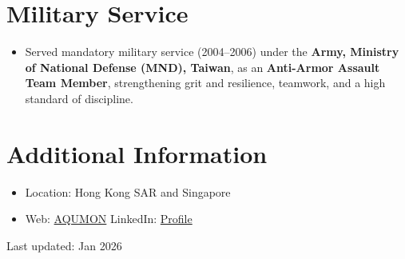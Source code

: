 \documentclass[11pt]{article}
\begin{document}
\section{Military Service}
\begin{itemize}
\item Served mandatory military service (2004--2006) under the \textbf{Army, Ministry of National Defense (MND), Taiwan}, as an \textbf{Anti-Armor Assault Team Member}, strengthening grit and resilience, teamwork, and a high standard of discipline.

\end{itemize}

\section{Additional Information}
\begin{itemize}
  \item Location: Hong Kong SAR and Singapore
  \item Web: \href{https://www.aqumon.com}{AQUMON} \quad\textbullet\quad
        LinkedIn: \href{https://www.linkedin.com/in/don-yao-tung-huang-8b590124}{Profile}
\end{itemize}
\vfill
\begin{flushright}
{\footnotesize Last updated: Jan 2026}
\end{flushright}
\end{document}
